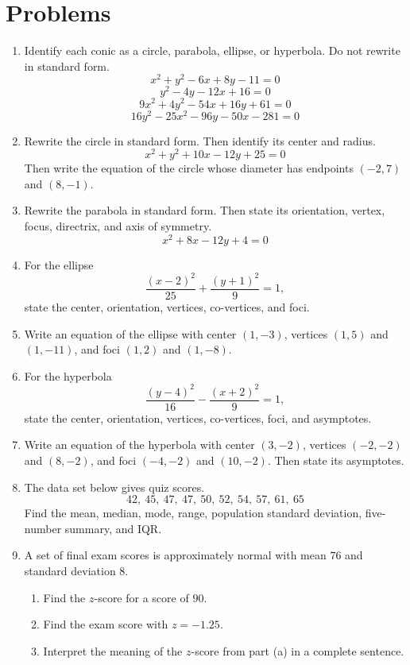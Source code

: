 \documentclass[12pt]{article}
\begin{document}
\section*{Problems}
\begin{enumerate}[leftmargin=*, itemsep=1.15em, topsep=0.8em]
  \item Identify each conic as a circle, parabola, ellipse, or hyperbola. Do not rewrite in standard form.
  \[
  x^2+y^2-6x+8y-11=0
  \]
  \[
  y^2-4y-12x+16=0
  \]
  \[
  9x^2+4y^2-54x+16y+61=0
  \]
  \[
  16y^2-25x^2-96y-50x-281=0
  \]

  \item Rewrite the circle in standard form. Then identify its center and radius.
  \[
  x^2+y^2+10x-12y+25=0
  \]
  Then write the equation of the circle whose diameter has endpoints $(-2,7)$ and $(8,-1)$.

  \item Rewrite the parabola in standard form. Then state its orientation, vertex, focus, directrix, and axis of symmetry.
  \[
  x^2+8x-12y+4=0
  \]

  \item For the ellipse
  \[
  \frac{(x-2)^2}{25}+\frac{(y+1)^2}{9}=1,
  \]
  state the center, orientation, vertices, co-vertices, and foci.

  \item Write an equation of the ellipse with center $(1,-3)$, vertices $(1,5)$ and $(1,-11)$, and foci $(1,2)$ and $(1,-8)$.

  \item For the hyperbola
  \[
  \frac{(y-4)^2}{16}-\frac{(x+2)^2}{9}=1,
  \]
  state the center, orientation, vertices, co-vertices, foci, and asymptotes.

  \item Write an equation of the hyperbola with center $(3,-2)$, vertices $(-2,-2)$ and $(8,-2)$, and foci $(-4,-2)$ and $(10,-2)$. Then state its asymptotes.

  \item The data set below gives quiz scores.
  \[
  42,\ 45,\ 47,\ 47,\ 50,\ 52,\ 54,\ 57,\ 61,\ 65
  \]
  Find the mean, median, mode, range, population standard deviation, five-number summary, and IQR.

  \item A set of final exam scores is approximately normal with mean $76$ and standard deviation $8$.
  \begin{enumerate}[label=(\alph*)]
    \item Find the $z$-score for a score of $90$.
    \item Find the exam score with $z=-1.25$.
    \item Interpret the meaning of the $z$-score from part (a) in a complete sentence.
  \end{enumerate}


\end{enumerate}
\end{document}
